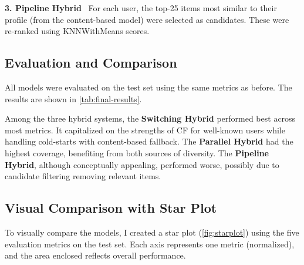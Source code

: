 \documentclass[11pt,a4paper]{article}
\begin{document}
\textbf{3. Pipeline Hybrid} \
For each user, the top-25 items most similar to their profile (from the content-based model) were selected as candidates. These were re-ranked using KNNWithMeans scores.

\subsection{Evaluation and Comparison}
All models were evaluated on the test set using the same metrics as before. The results are shown in \autoref{tab:final-results}.

\begin{table}[H]
    \centering
    \caption{Comparison of selected recommenders on the test set (ratings $\geq$ 4 considered relevant)}
    \label{tab:final-results}
\end{table}

Among the three hybrid systems, the \textbf{Switching Hybrid} performed best across most metrics. It capitalized on the strengths of CF for well-known users while handling cold-starts with content-based fallback. The \textbf{Parallel Hybrid} had the highest coverage, benefiting from both sources of diversity. The \textbf{Pipeline Hybrid}, although conceptually appealing, performed worse, possibly due to candidate filtering removing relevant items.

\subsection{Visual Comparison with Star Plot}
To visually compare the models, I created a star plot (\autoref{fig:starplot}) using the five evaluation metrics on the test set. Each axis represents one metric (normalized), and the area enclosed reflects overall performance.
\end{document}
